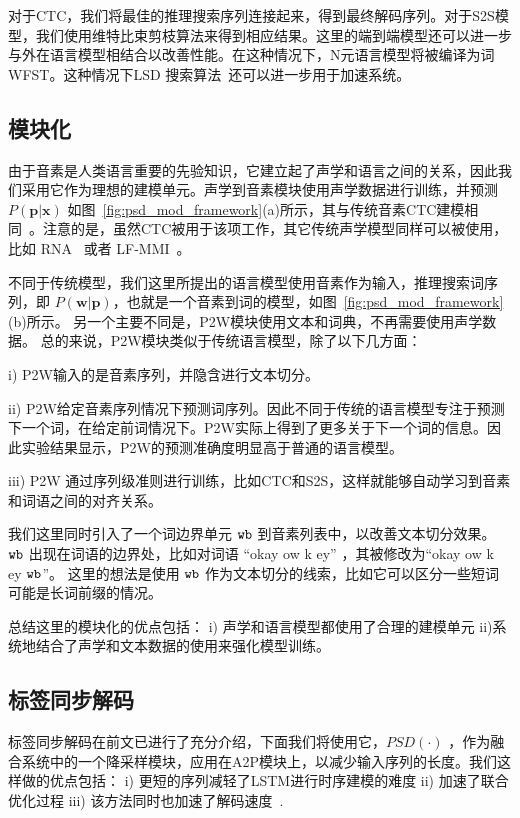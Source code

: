对于CTC，我们将最佳的推理搜索序列连接起来，得到最终解码序列。对于S2S模型，我们使用维特比束剪枝算法来得到相应结果。这里的端到端模型还可以进一步与外在语言模型相结合以改善性能。在这种情况下，N元语言模型将被编译为词WFST。这种情况下LSD 搜索算法~\cite{zhc00-chen-tasl2017}还可以进一步用于加速系统。


\subsection{模块化}
\label{sec:psd_mod_modu}
由于音素是人类语言重要的先验知识，它建立起了声学和语言之间的关系，因此我们采用它作为理想的建模单元。声学到音素模块使用声学数据进行训练，并预测 $P(\mathbf{p}|\mathbf{x})$ 如图~\ref{fig:psd_mod_framework}(a)所示，其与传统音素CTC建模相同~\cite{miao2015eesen}。注意的是，虽然CTC被用于该项工作，其它传统声学模型同样可以被使用，比如 RNA~\cite{sak2017recurrent} 或者 LF-MMI~\cite{povey2016purely}。

不同于传统模型，我们这里所提出的语言模型使用音素作为输入，推理搜索词序列，即 $P(\mathbf{w}|\mathbf{p})$，也就是一个音素到词的模型，如图~\ref{fig:psd_mod_framework}(b)所示。
另一个主要不同是，P2W模块使用文本和词典，不再需要使用声学数据。
总的来说，P2W模块类似于传统语言模型，除了以下几方面：

i) P2W输入的是音素序列，并隐含进行文本切分。

ii) P2W给定音素序列情况下预测词序列。因此不同于传统的语言模型专注于预测下一个词，在给定前词情况下。P2W实际上得到了更多关于下一个词的信息。因此实验结果显示，P2W的预测准确度明显高于普通的语言模型。

iii) P2W 通过序列级准则进行训练，比如CTC和S2S，这样就能够自动学习到音素和词语之间的对齐关系。


我们这里同时引入了一个词边界单元 $\tt wb$ 到音素列表中，以改善文本切分效果。 $\tt wb$ 出现在词语的边界处，比如对词语 ``okay ow k ey'' ，其被修改为``okay ow k ey $\tt wb$''。 这里的想法是使用 $\tt wb$ 作为文本切分的线索，比如它可以区分一些短词可能是长词前缀的情况。

总结这里的模块化的优点包括： i) 声学和语言模型都使用了合理的建模单元 ii)系统地结合了声学和文本数据的使用来强化模型训练。


\subsection{标签同步解码}
\label{sec:psd_mod_psd}
标签同步解码在前文已进行了充分介绍，下面我们将使用它，$PSD(\cdot)$ ，作为融合系统中的一个降采样模块，应用在A2P模块上，以减少输入序列的长度。我们这样做的优点包括： i) 更短的序列减轻了LSTM进行时序建模的难度 ii)  加速了联合优化过程 iii) 该方法同时也加速了解码速度~\cite{zhc00-chen-tasl2017}.


